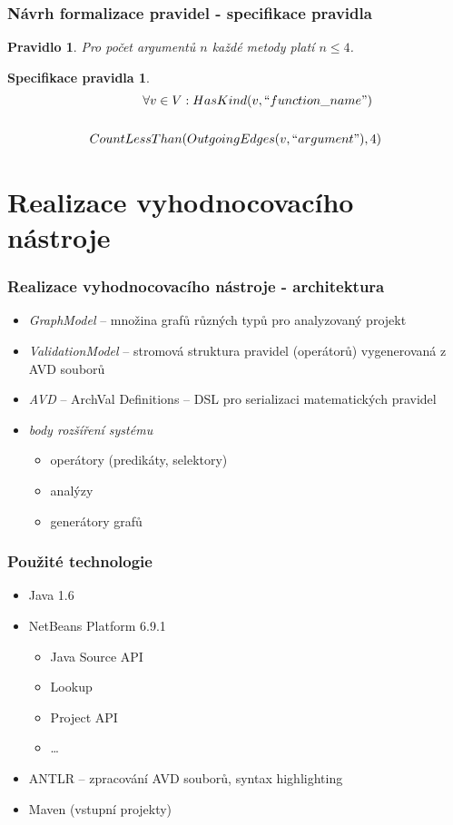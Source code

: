 \documentclass{beamer}
\newtheorem*{rulespec}{Pravidlo}
\newtheorem*{rulemathspec}{Specifikace pravidla}
\begin{document}
\begin{frame}
  \frametitle{Návrh formalizace pravidel - specifikace pravidla}
  \begin{rulespec}
    Pro počet argumentů $n$ každé metody platí $n \leq 4$.
  \end{rulespec}
  \begin{rulemathspec}
    \begin{align*}
      \forall v \in V &: HasKind(v, ``function\_name") \\
      \\
      CountLessThan&(OutgoingEdges(v, ``argument"), 4)
    \end{align*}
  \end{rulemathspec}
\end{frame}

\section{Realizace vyhodnocovacího nástroje}
\begin{frame}
  \frametitle{Realizace vyhodnocovacího nástroje - architektura}
  \begin{itemize}
    \item \emph{GraphModel} -- množina grafů různých typů pro analyzovaný projekt
    \item \emph{ValidationModel} -- stromová struktura pravidel (operátorů) vygenerovaná z AVD souborů
    \item \emph{AVD} -- ArchVal Definitions -- DSL pro serializaci matematických pravidel
    \item \emph{body rozšíření systému}
    \begin{itemize}
      \item operátory (predikáty, selektory)
      \item analýzy
      \item generátory grafů
    \end{itemize}      
  \end{itemize}
\end{frame}

\begin{frame}
\frametitle{Použité technologie}
\begin{itemize}
\item Java 1.6
\item NetBeans Platform 6.9.1
\begin{itemize}
\item Java Source API
\item Lookup
\item Project API
\item \ldots
\end{itemize}
\item ANTLR -- zpracování AVD souborů, syntax highlighting
\item Maven (vstupní projekty)
\end{itemize}
\end{frame}
\end{document}
